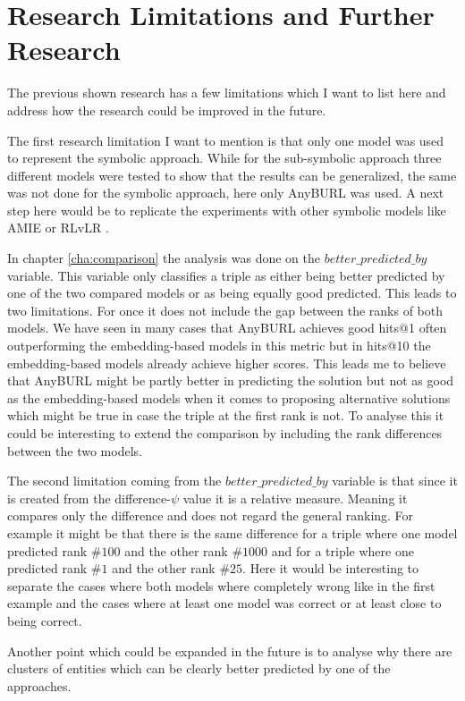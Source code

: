 \chapter{Research Limitations and Further Research}
\label{cha:limitations}

The previous shown research has a few limitations which I want to list here and address how the research could be improved in the future.

The first research limitation I want to mention is that only one model was used to represent the symbolic approach. While for the sub-symbolic approach three different models were tested to show that the results can be generalized, the same was not done for the symbolic approach, here only AnyBURL was used. A next step here would be to replicate the experiments with other symbolic models like AMIE \cite{galarraga_amie_2013} or RLvLR \cite{ghiasnezhad_omran_scalable_2018}. 

In chapter \ref{cha:comparison} the analysis was done on the $better\_predicted\_by$ variable. This variable only classifies a triple as either being better predicted by one of the two compared models or as being equally good predicted. This leads to two limitations. For once it does not include the gap between the ranks of both models. We have seen in many cases that AnyBURL achieves good hits@1 often outperforming the embedding-based models in this metric but in hits@10 the embedding-based models already achieve higher scores. This leads me to believe that AnyBURL might be partly better in predicting the solution but not as good as the embedding-based models when it comes to proposing alternative solutions which might be true in case the triple at the first rank is not. To analyse this it could be interesting to extend the comparison by including the rank differences between the two models.

The second limitation coming from the $better\_predicted\_by$ variable is that since it is created from the difference-$\psi$ value it is a relative measure. Meaning it compares only the difference and does not regard the general ranking. For example it might be that there is the same difference for a triple where one model predicted rank $\#100$ and the other rank $\#1000$ and for a triple where one predicted rank $\#1$ and the other rank $\#25$. Here it would be interesting to separate the cases where both models where completely wrong like in the first example and the cases where at least one model was correct or at least close to being correct. 

Another point which could be expanded in the future is to analyse why there are clusters of entities which can be clearly better predicted by one of the approaches.
